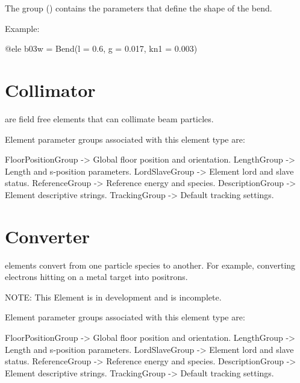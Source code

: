 The  group () contains the parameters that define the shape of the bend.

Example:
\begin{example}
  @ele b03w = Bend(l = 0.6, g = 0.017, kn1 = 0.003)
\end{example}

\newpage

\section{Collimator}
\label{s:collimator}

 are field free elements that can collimate beam particles.

Element parameter groups associated with this element type are:
\TOPrule
\begin{example}
  FloorPositionGroup -> Global floor position and orientation.  
  LengthGroup        -> Length and s-position parameters.  
  LordSlaveGroup     -> Element lord and slave status.  
  ReferenceGroup     -> Reference energy and species.  
  DescriptionGroup   -> Element descriptive strings.  
  TrackingGroup      -> Default tracking settings.  
\end{example}
\BOTTOMrule

\section{Converter}
\label{s:converter}

 elements convert from one particle species to another. 
For example, converting electrons hitting on a metal target into positrons.

NOTE: This Element is in development and is incomplete.

Element parameter groups associated with this element type are:
\TOPrule
\begin{example}
  FloorPositionGroup -> Global floor position and orientation.  
  LengthGroup        -> Length and s-position parameters.  
  LordSlaveGroup     -> Element lord and slave status.  
  ReferenceGroup     -> Reference energy and species.  
  DescriptionGroup   -> Element descriptive strings.  
  TrackingGroup      -> Default tracking settings.  
\end{example}
\BOTTOMrule

